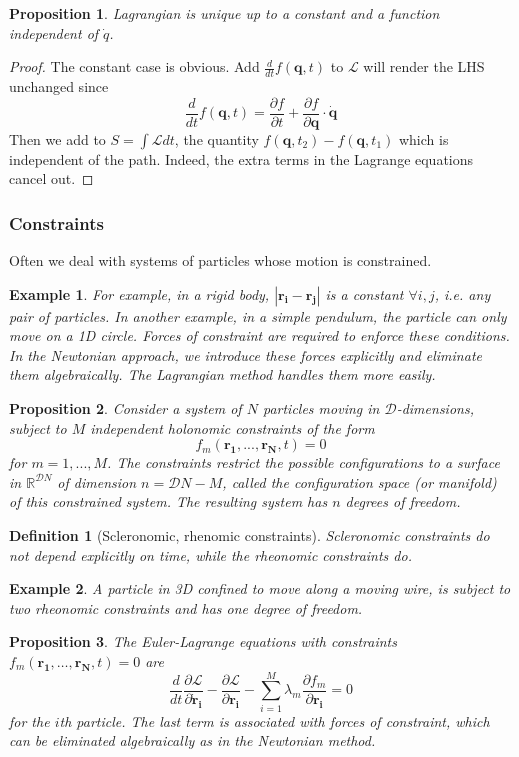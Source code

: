 \documentclass[a4paper]{article}
\newtheorem{defi}{Definition}[section]
\newtheorem{eg}{Example}[section]
\newtheorem{prop}{Proposition}[section]
\theoremstyle{new}
\begin{document}
\begin{prop}
Lagrangian is unique up to a constant and a function independent of $\dot{q}$.
\end{prop}
\begin{proof}
The constant case is obvious. Add $\frac{d}{dt}f(\mathbf{q},t)$ to $\mathcal{L}$ will render the LHS unchanged since 
$$\frac{d}{dt}f(\mathbf{q},t)=\frac{\partial f}{\partial t}+\frac{\partial f}{\partial\mathbf{q}}\cdot\mathbf{\dot{q}}$$
Then we add to $S=\int\mathcal{L}dt$, the quantity $f(\mathbf{q},t_2)-f(\mathbf{q},t_1)$ which is independent of the path. Indeed, the extra terms in the Lagrange equations cancel out.
\end{proof}
\subsubsection{Constraints}
Often we deal with systems of particles whose motion is constrained. 
\begin{eg}
For example, in a rigid body, $|\mathbf{r_i}-\mathbf{r_j}|$ is a constant $\forall i,j$, i.e. any pair of particles. In another example, in a simple pendulum, the particle can only move on a 1D circle. Forces of constraint are required to enforce these conditions. In the Newtonian approach, we introduce these forces explicitly and eliminate them algebraically. The Lagrangian method handles them more easily.
\end{eg}
\begin{prop}
Consider a system of $N$ particles moving in $\mathcal{D}$-dimensions, subject to $M$ independent holonomic constraints of the form 
$$f_m(\mathbf{r_1},...,\mathbf{r_N},t)=0$$
for $m=1,...,M$. The constraints restrict the possible configurations to a surface in $\mathbb{R}^{\mathcal{D}N}$ of dimension $n=\mathcal{D}N-M$, called the configuration space (or manifold) of this constrained system. The resulting system has $n$ degrees of freedom.
\end{prop}
\begin{defi}[Scleronomic, rhenomic constraints]
Scleronomic constraints do not depend explicitly on time, while the rheonomic constraints do. 
\end{defi}
\begin{eg}
A particle in 3D confined to move along a moving wire, is subject to two rheonomic constraints and has one degree of freedom. 
\end{eg}
\begin{prop}
The Euler-Lagrange equations with constraints $f_m(\mathbf{r_1},\dots,\mathbf{r_N},t)=0$ are
$$\frac{d}{dt}\frac{\partial\mathcal{L}}{\partial\mathbf{\dot{r}_i}}-\frac{\partial\mathcal{L}}{\partial\mathbf{r_i}}-\sum_{i=1}^M\lambda_m\frac{\partial f_m}{\partial\mathbf{r_i}}=0$$
for the $i$th particle. The last term is associated with forces of constraint, which can be eliminated algebraically as in the Newtonian method.
\end{prop}
\end{document}
